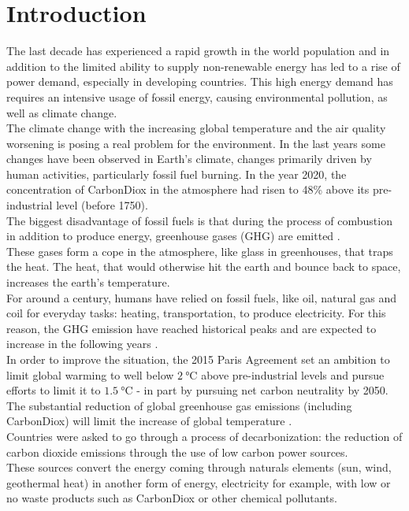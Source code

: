 \chapter{Introduction}

%
The last decade has experienced a rapid growth in the world population and in addition to the limited ability to supply non-renewable energy has led to a rise of power demand, especially in developing countries. This high energy demand has requires an intensive usage of fossil energy, causing environmental pollution, as well as climate change.\\ 

The climate change with the increasing global temperature and the air quality worsening is posing a real problem for the environment. In the last years some changes have been observed in Earth’s climate, changes primarily driven by human activities, particularly fossil fuel burning. In the year 2020, the concentration of \gls{CarbonDiox} in the atmosphere had risen to 48\% above its pre-industrial level (before 1750). \\

The biggest disadvantage of fossil fuels is that during the process of combustion in addition to produce energy, greenhouse gases (\gls{GHG}) are emitted \cite{greenhousegasemissions}. \\
These gases form a cope in the atmosphere, like glass in greenhouses, that traps the heat. The heat, that would otherwise hit the earth and bounce back to space, increases the earth's temperature. \\
For around a century, humans have relied on fossil fuels, like oil, natural gas and coil for everyday tasks: heating, transportation, to produce electricity. For this reason, the \gls{GHG} emission have reached historical peaks and are expected to increase in the following years \cite{co2predic}.\\

In order to improve the situation, the 2015 Paris Agreement set an ambition to limit global warming to well below $\SI{2}{\degreeCelsius}$ above pre-industrial levels and pursue efforts to limit it to $\SI{1.5}{\degreeCelsius}$ - in part by pursuing net carbon neutrality by 2050. The substantial reduction of global greenhouse gas emissions (including \gls{CarbonDiox})  will limit the increase of global temperature \cite{french_conference}. \\
Countries were asked to go through a process of decarbonization: the reduction of carbon dioxide emissions through the use of low carbon power sources. \\
These sources convert the energy coming through naturals elements (sun, wind, geothermal heat) in another form of energy, electricity for example, with low or no waste products such as \gls{CarbonDiox} or other chemical pollutants. 

